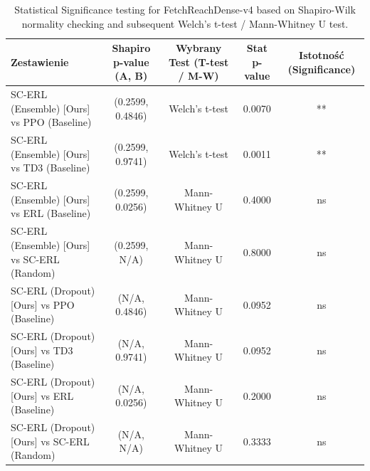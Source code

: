 \begin{table}
\caption{Statistical Significance testing for FetchReachDense-v4 based on Shapiro-Wilk normality checking and subsequent Welch's t-test / Mann-Whitney U test.}
\label{tab:sig_FetchReachDense-v4}
\begin{tabular}{lcccc}
\toprule
Zestawienie & Shapiro p-value (A, B) & Wybrany Test (T-test / M-W) & Stat p-value & Istotność (Significance) \\
\midrule
SC-ERL (Ensemble) [Ours] vs PPO (Baseline) & (0.2599, 0.4846) & Welch's t-test & 0.0070 & ** \\
SC-ERL (Ensemble) [Ours] vs TD3 (Baseline) & (0.2599, 0.9741) & Welch's t-test & 0.0011 & ** \\
SC-ERL (Ensemble) [Ours] vs ERL (Baseline) & (0.2599, 0.0256) & Mann-Whitney U & 0.4000 & ns \\
SC-ERL (Ensemble) [Ours] vs SC-ERL (Random) & (0.2599, N/A) & Mann-Whitney U & 0.8000 & ns \\
SC-ERL (Dropout) [Ours] vs PPO (Baseline) & (N/A, 0.4846) & Mann-Whitney U & 0.0952 & ns \\
SC-ERL (Dropout) [Ours] vs TD3 (Baseline) & (N/A, 0.9741) & Mann-Whitney U & 0.0952 & ns \\
SC-ERL (Dropout) [Ours] vs ERL (Baseline) & (N/A, 0.0256) & Mann-Whitney U & 0.2000 & ns \\
SC-ERL (Dropout) [Ours] vs SC-ERL (Random) & (N/A, N/A) & Mann-Whitney U & 0.3333 & ns \\
\bottomrule
\end{tabular}
\end{table}
